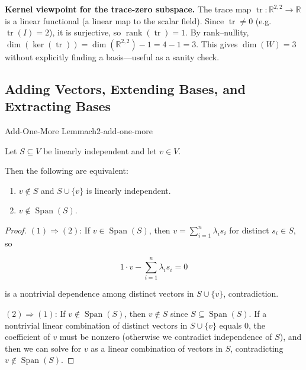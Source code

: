 \begin{policynote}
\textbf{Kernel viewpoint for the trace-zero subspace.}
The trace map $\operatorname{tr}:\mathbb{R}^{2,2}\to\mathbb{R}$ is a linear functional (a linear map to the scalar field).
Since $\operatorname{tr}\neq 0$ (e.g.\ $\operatorname{tr}(I)=2$), it is surjective, so $\operatorname{rank}(\operatorname{tr})=1$.
By rank--nullity, $\dim(\ker(\operatorname{tr}))=\dim(\mathbb{R}^{2,2})-1=4-1=3$.
This gives $\dim(W)=3$ without explicitly finding a basis---useful as a sanity check.
\end{policynote}


\subsection{Adding Vectors, Extending Bases, and Extracting Bases}


\begin{theorem}{Add-One-More Lemma}{ch2-add-one-more}

Let $S\subseteq V$ be linearly independent and let $v\in V$.

Then the following are equivalent:

\begin{enumerate}

\item $v\notin S$ and $S\cup\{v\}$ is linearly independent.

\item $v\notin \operatorname{Span}(S)$.

\end{enumerate}

\begin{proof}

$(1)\Rightarrow(2)$: If $v\in \operatorname{Span}(S)$, then $v=\sum_{i=1}^n\lambda_i s_i$ for distinct $s_i\in S$, so

\[
1\cdot v-\sum_{i=1}^n\lambda_i s_i=0
\]

is a nontrivial dependence among distinct vectors in $S\cup\{v\}$, contradiction.

$(2)\Rightarrow(1)$: If $v\notin \operatorname{Span}(S)$, then $v\notin S$ since $S\subseteq \operatorname{Span}(S)$. If a nontrivial linear combination of distinct vectors in $S\cup\{v\}$ equals $0$, the coefficient of $v$ must be nonzero (otherwise we contradict independence of $S$), and then we can solve for $v$ as a linear combination of vectors in $S$, contradicting $v\notin\operatorname{Span}(S)$.

\end{proof}

\end{theorem}

